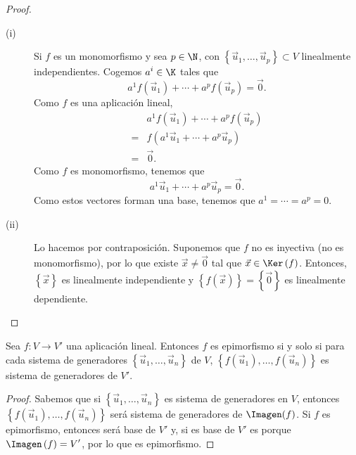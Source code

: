 \begin{proof}
\begin{description}
	\item[(i)] Si $\displaystyle f $ es un monomorfismo y sea $\displaystyle p \in \N $, con $\displaystyle \left\{ \vec{u}_{1}, \ldots, \vec{u}_{p}\right\} \subset V $ linealmente independientes. Cogemos $\displaystyle a^{i}\in\K $ tales que 
		\[a^{1}f\left(\vec{u}_{1}\right) + \cdots + a^{p}f\left(\vec{u}_{p}\right) = \vec{0} .\]
Como $\displaystyle f $ es una aplicación lineal, 
\[
\begin{split}
	& a^{1}f\left(\vec{u}_{1}\right) + \cdots + a^{p}f\left(\vec{u}_{p}\right) \\
	=& f\left(a^{1}\vec{u}_{1}+ \cdots + a^{p}\vec{u}_{p}\right) \\
	=&\vec{0} .
\end{split}
\]
Como $\displaystyle f $ es monomorfismo, tenemos que 
\[a^{1}\vec{u}_{1}+ \cdots + a^{p}\vec{u}_{p} = \vec{0} .\]
Como estos vectores forman una base, tenemos que $\displaystyle a^{1} = \cdots = a^{p} = 0 $.
\item[(ii)] Lo hacemos por contraposición. Suponemos que $\displaystyle f $ no es inyectiva (no es monomorfismo), por lo que existe $\displaystyle \vec{x} \neq \vec{0} $ tal que $\displaystyle \vec{x} \in \Ker\left(f\right) $. Entonces, $\displaystyle \left\{ \vec{x}\right\}  $ es linealmente independiente y $\displaystyle \left\{ f\left(\vec{x}\right)\right\}  = \left\{ \vec{0}\right\}  $ es linealmente dependiente.
\end{description}
\end{proof}

\begin{ftheorem}[]
	\normalfont Sea $\displaystyle f: V \to V' $ una aplicación lineal. Entonces $\displaystyle f $ es epimorfismo si y solo si para cada sistema de generadores $\displaystyle \left\{ \vec{u}_{1}, \ldots, \vec{u}_{n}\right\}  $ de $\displaystyle V $, $\displaystyle \left\{ f\left(\vec{u}_{1}\right), \ldots, f\left(\vec{u}_{n}\right)\right\}  $ es sistema de generadores de $\displaystyle V' $.
\end{ftheorem}

\begin{proof}
	Sabemos que si $\displaystyle \left\{ \vec{u}_{1}, \ldots , \vec{u}_{n}\right\}  $ es sistema de generadores en $\displaystyle V $, entonces $\displaystyle \left\{f\left(\vec{u}_{1}\right), \ldots, f\left(\vec{u}_{n}\right) \right\}  $ será sistema de generadores de $\displaystyle \Imagen (f)  $. Si $\displaystyle f $ es epimorfismo, entonces será base de $\displaystyle V' $ y, si es base de $\displaystyle V' $ es porque $\displaystyle \Imagen\left(f\right)= V' $, por lo que es epimorfismo.
\end{proof}


